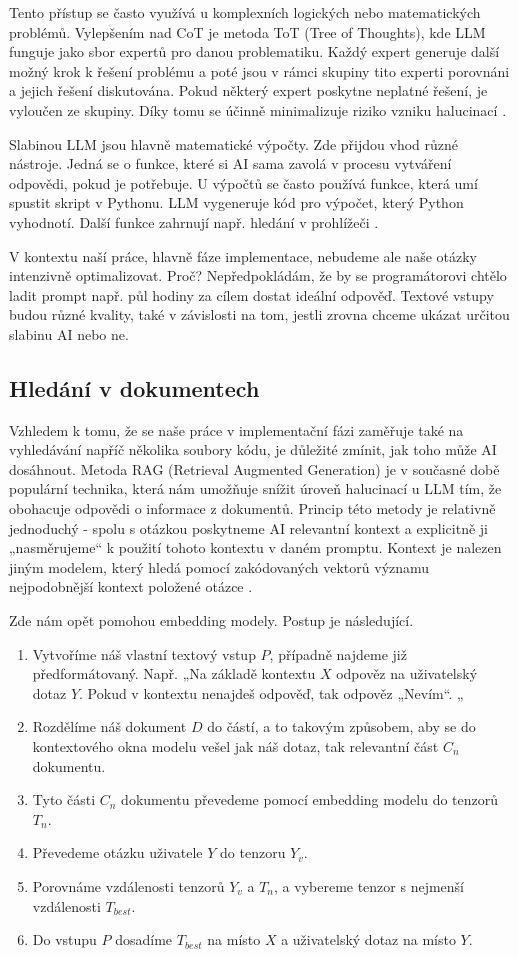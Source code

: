 \documentclass[FM,DP]{tulthesis}
\begin{document}
		Tento přístup se často využívá u komplexních logických nebo matematických problémů. Vylepšením nad CoT je metoda ToT (Tree of Thoughts), kde LLM funguje jako sbor expertů pro danou problematiku. Každý expert generuje další možný krok k řešení problému a poté jsou v rámci skupiny tito experti porovnáni a jejich řešení diskutována. Pokud některý expert poskytne neplatné řešení, je vyloučen ze skupiny. Díky tomu se účinně minimalizuje riziko vzniku halucinací \cite{PEG}.
		
		Slabinou LLM jsou hlavně matematické výpočty. Zde přijdou vhod různé nástroje. Jedná se o funkce, které si AI sama zavolá v procesu vytváření odpovědi, pokud je potřebuje. U výpočtů se často používá funkce, která umí spustit skript v Pythonu. LLM vygeneruje kód pro výpočet, který Python vyhodnotí. Další funkce zahrnují např. hledání v prohlížeči \cite{PEG}.
		
		V kontextu naší práce, hlavně fáze implementace, nebudeme ale naše otázky intenzivně optimalizovat. Proč? Nepředpokládám, že by se programátorovi chtělo ladit prompt např. půl hodiny za cílem dostat ideální odpověď. Textové vstupy budou různé kvality, také v závislosti na tom, jestli zrovna chceme ukázat určitou slabinu AI nebo ne. 
		
		\subsection{Hledání v dokumentech}
		Vzhledem k tomu, že se naše práce v implementační fázi zaměřuje také na vyhledávání napříč několika soubory kódu, je důležité zmínit, jak toho může AI dosáhnout. Metoda RAG (Retrieval Augmented Generation) je v současné době populární technika, která nám umožňuje snížit úroveň halucinací u LLM tím, že obohacuje odpovědi o informace z dokumentů. Princip této metody je relativně jednoduchý - spolu s otázkou poskytneme AI relevantní kontext a explicitně ji „nasměrujeme“ k použití tohoto kontextu v daném promptu. Kontext je nalezen jiným modelem, který hledá pomocí zakódovaných vektorů významu nejpodobnější kontext položené otázce \cite{paper:RAG}.
		
		Zde nám opět pomohou embedding modely. Postup je následující.
		\begin{enumerate}
			\item Vytvoříme náš vlastní textový vstup $P$, případně najdeme již předformátovaný. Např. „Na základě kontextu $X$ odpověz na uživatelský dotaz $Y$. Pokud v kontextu nenajdeš odpověď, tak odpověz „Nevím“. „
			\item Rozdělíme náš dokument $D$ do částí, a to takovým způsobem, aby se do kontextového okna modelu vešel jak náš dotaz, tak relevantní část $C_n$ dokumentu.
			\item Tyto části $C_n$ dokumentu převedeme pomocí embedding modelu do tenzorů $T_n$.
			\item Převedeme otázku uživatele $Y$ do tenzoru $Y_v$.
			\item Porovnáme vzdálenosti tenzorů $Y_v$ a $T_n$, a vybereme tenzor s nejmenší vzdálenosti $T_{best}$. 
			\item Do vstupu $P$ dosadíme $T_{best}$ na místo $X$ a uživatelský dotaz na místo $Y$.
		\end{enumerate}
		
\end{document}
